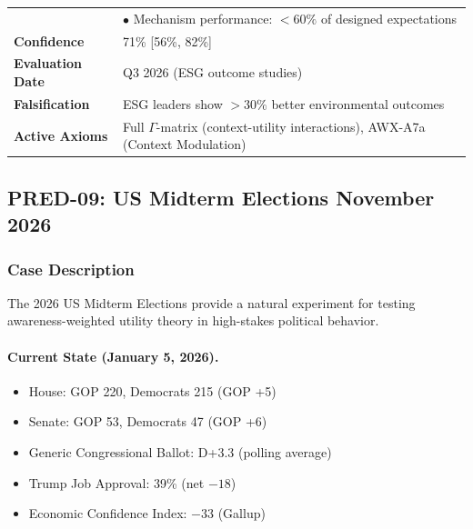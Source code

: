 \begin{table}[htbp]
\begin{tabular}{p{3cm}p{11cm}}
& $\bullet$ Mechanism performance: $<60\%$ of designed expectations \\
\textbf{Confidence} & 71\% [56\%, 82\%] \\
\textbf{Evaluation Date} & Q3 2026 (ESG outcome studies) \\
\textbf{Falsification} & ESG leaders show $>30\%$ better environmental outcomes \\
\textbf{Active Axioms} & Full $\Gamma$-matrix (context-utility interactions), AWX-A7a (Context Modulation) \\
\bottomrule
\end{tabular}
\end{table}






\subsection{PRED-09: US Midterm Elections November 2026}
\label{subsec:pred-09-midterms}

\subsubsection{Case Description}

The 2026 US Midterm Elections provide a natural experiment for testing 
awareness-weighted utility theory in high-stakes political behavior.

\paragraph{Current State (January 5, 2026).}
\begin{itemize}
    \item House: GOP 220, Democrats 215 (GOP +5)
    \item Senate: GOP 53, Democrats 47 (GOP +6)
    \item Generic Congressional Ballot: D+3.3 (polling average)
    \item Trump Job Approval: 39\% (net $-18$)
    \item Economic Confidence Index: $-33$ (Gallup)
\end{itemize}

